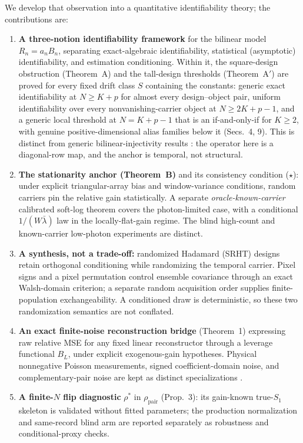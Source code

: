 We develop that observation into a quantitative identifiability theory; the contributions are:

\begin{enumerate}[leftmargin=*,itemsep=1pt,topsep=2pt]
\item \textbf{A three-notion identifiability framework} for the bilinear model $R_n = a_n B_n$, separating exact-algebraic identifiability, statistical (asymptotic) identifiability, and estimation conditioning. Within it, the square-design obstruction (Theorem~A) and the tall-design thresholds (Theorem~A$'$) are proved for every fixed drift class $S$ containing the constants: generic exact identifiability at $N \ge K + p$ for almost every design--object pair, uniform identifiability over every nonvanishing-carrier object at $N \ge 2K + p - 1$, and a generic local threshold at $N = K + p - 1$ that is an if-and-only-if for $K \ge 2$, with genuine positive-dimensional alias families below it (Secs.~4, 9). This is distinct from generic bilinear-injectivity results \cite{KechKrahmer1603.07316,LiLeeBresler1501.06120,AhmedRechtRomberg1211.5608,ChoudharyMitra1402.2637,KuengRauhutTerstiege1410.6913}: the operator here is a diagonal-row map, and the anchor is temporal, not structural.

\item \textbf{The stationarity anchor (Theorem~B)} and its consistency condition ($\star$): under explicit triangular-array bias and window-variance conditions, random carriers pin the relative gain statistically. A separate \emph{oracle-known-carrier} calibrated soft-log theorem covers the photon-limited case, with a conditional $1/(W\bar\lambda)$ law in the locally-flat-gain regime. The blind high-count and known-carrier low-photon experiments are distinct.

\item \textbf{A synthesis, not a trade-off:} randomized Hadamard (SRHT) designs retain orthogonal conditioning while randomizing the temporal carrier. Pixel signs and a pixel permutation control ensemble covariance through an exact Walsh-domain criterion; a separate random acquisition order supplies finite-population exchangeability. A conditioned draw is deterministic, so these two randomization semantics are not conflated.

\item \textbf{An exact finite-noise reconstruction bridge} (Theorem~1) expressing raw relative MSE for any fixed linear reconstructor through a leverage functional $B_L$, under explicit exogenous-gain hypotheses. Physical nonnegative Poisson measurements, signed coefficient-domain noise, and complementary-pair noise are kept as distinct specializations \cite{Ferri2010PRL,Sun2012OE}.

\item \textbf{A finite-$N$ flip diagnostic} $\rho^*$ in $\rho_{\mathrm{pair}}$ (Prop.~3): its gain-known true-$S_1$ skeleton is validated without fitted parameters; the production normalization and same-record blind arm are reported separately as robustness and conditional-proxy checks.
\end{enumerate}

